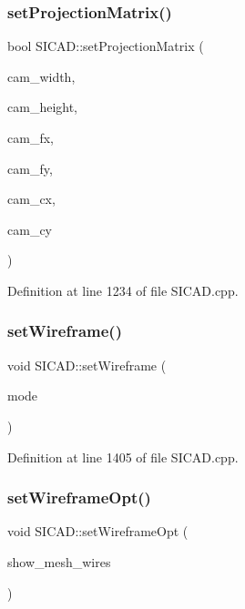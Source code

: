 \subsubsection{\texorpdfstring{set\+Projection\+Matrix()}{setProjectionMatrix()}}
{\footnotesize\ttfamily bool S\+I\+C\+A\+D\+::set\+Projection\+Matrix (\begin{DoxyParamCaption}\item[{const G\+Lsizei}]{cam\+\_\+width,  }\item[{const G\+Lsizei}]{cam\+\_\+height,  }\item[{const G\+Lfloat}]{cam\+\_\+fx,  }\item[{const G\+Lfloat}]{cam\+\_\+fy,  }\item[{const G\+Lfloat}]{cam\+\_\+cx,  }\item[{const G\+Lfloat}]{cam\+\_\+cy }\end{DoxyParamCaption})}



Definition at line 1234 of file S\+I\+C\+A\+D.\+cpp.

\mbox{\label{classSICAD_ae7af7aba5d81b9f1cc3e273a55811a70}} 
\subsubsection{\texorpdfstring{set\+Wireframe()}{setWireframe()}}
{\footnotesize\ttfamily void S\+I\+C\+A\+D\+::set\+Wireframe (\begin{DoxyParamCaption}\item[{G\+Lenum}]{mode }\end{DoxyParamCaption})\hspace{0.3cm}{\ttfamily [private]}}



Definition at line 1405 of file S\+I\+C\+A\+D.\+cpp.

\mbox{\label{classSICAD_a4cf80a273b6b0d946cd298472c63ddd4}} 
\subsubsection{\texorpdfstring{set\+Wireframe\+Opt()}{setWireframeOpt()}}
{\footnotesize\ttfamily void S\+I\+C\+A\+D\+::set\+Wireframe\+Opt (\begin{DoxyParamCaption}\item[{bool}]{show\+\_\+mesh\+\_\+wires }\end{DoxyParamCaption})}



